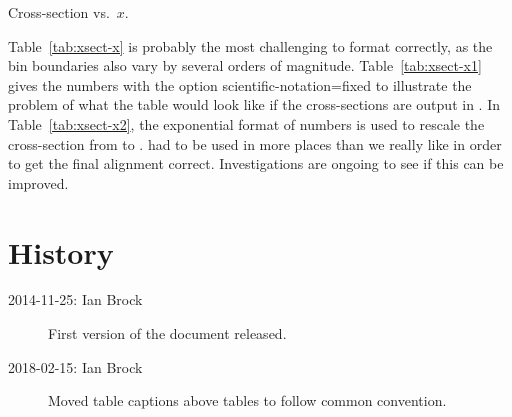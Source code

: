 \documentclass[UKenglish,texlive=2016]{\ATLASLATEXPATH atlasdoc}
\begin{document}
\begin{table}[htb]
  \caption{Cross-section vs.\ $x$.}
  \label{tab:xsect-x}
  \centering
  \renewcommand{\arraystretch}{1.4}
\end{table}

Table~\ref{tab:xsect-x} is probably the most challenging to format
correctly, as the bin boundaries also vary by several orders of
magnitude. Table~\ref{tab:xsect-x1} gives the numbers with the option
\textsf{scientific-notation=fixed} to illustrate the problem of what
the table would look like if the cross-sections are output in
\si{\pb}.  In Table~\ref{tab:xsect-x2}, the exponential format of
numbers is used to rescale the cross-section from \si{\pb} to
\si{\nb}.   had to be used in more places than we
really like in order to get the final alignment
correct. Investigations are ongoing to see if this can be improved.

\section*{History}

\begin{description}
\item[2014-11-25: Ian Brock] First version of the document released.
\item[2018-02-15: Ian Brock] Moved table captions above tables to follow common convention.
\end{description}

\printbibliography
% 
% 
\end{document}
